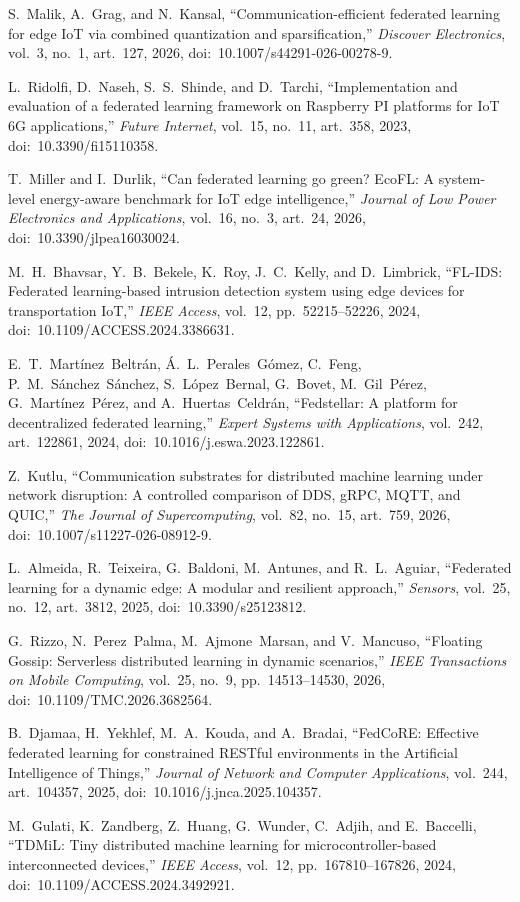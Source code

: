 S.~Malik, A.~Grag, and N.~Kansal,
``Communication-efficient federated learning for edge IoT via combined quantization and sparsification,''
\emph{Discover Electronics}, vol.~3, no.~1, art.~127, 2026, doi:~10.1007/s44291-026-00278-9.

L.~Ridolfi, D.~Naseh, S.~S.~Shinde, and D.~Tarchi,
``Implementation and evaluation of a federated learning framework on Raspberry PI platforms for IoT 6G applications,''
\emph{Future Internet}, vol.~15, no.~11, art.~358, 2023, doi:~10.3390/fi15110358.

T.~Miller and I.~Durlik,
``Can federated learning go green? EcoFL: A system-level energy-aware benchmark for IoT edge intelligence,''
\emph{Journal of Low Power Electronics and Applications}, vol.~16, no.~3, art.~24, 2026, doi:~10.3390/jlpea16030024.

M.~H.~Bhavsar, Y.~B.~Bekele, K.~Roy, J.~C.~Kelly, and D.~Limbrick,
``FL-IDS: Federated learning-based intrusion detection system using edge devices for transportation IoT,''
\emph{IEEE Access}, vol.~12, pp.~52215--52226, 2024, doi:~10.1109/ACCESS.2024.3386631.

E.~T.~Mart\'{i}nez~Beltr\'{a}n, \'{A}.~L.~Perales~G\'{o}mez, C.~Feng, P.~M.~S\'{a}nchez~S\'{a}nchez, S.~L\'{o}pez~Bernal, G.~Bovet, M.~Gil~P\'{e}rez, G.~Mart\'{i}nez~P\'{e}rez, and A.~Huertas~Celdr\'{a}n,
``Fedstellar: A platform for decentralized federated learning,''
\emph{Expert Systems with Applications}, vol.~242, art.~122861, 2024, doi:~10.1016/j.eswa.2023.122861.

Z.~Kutlu,
``Communication substrates for distributed machine learning under network disruption: A controlled comparison of DDS, gRPC, MQTT, and QUIC,''
\emph{The Journal of Supercomputing}, vol.~82, no.~15, art.~759, 2026, doi:~10.1007/s11227-026-08912-9.

L.~Almeida, R.~Teixeira, G.~Baldoni, M.~Antunes, and R.~L.~Aguiar,
``Federated learning for a dynamic edge: A modular and resilient approach,''
\emph{Sensors}, vol.~25, no.~12, art.~3812, 2025, doi:~10.3390/s25123812.

G.~Rizzo, N.~Perez~Palma, M.~Ajmone~Marsan, and V.~Mancuso,
``Floating Gossip: Serverless distributed learning in dynamic scenarios,''
\emph{IEEE Transactions on Mobile Computing}, vol.~25, no.~9, pp.~14513--14530, 2026, doi:~10.1109/TMC.2026.3682564.

B.~Djamaa, H.~Yekhlef, M.~A.~Kouda, and A.~Bradai,
``FedCoRE: Effective federated learning for constrained RESTful environments in the Artificial Intelligence of Things,''
\emph{Journal of Network and Computer Applications}, vol.~244, art.~104357, 2025, doi:~10.1016/j.jnca.2025.104357.

M.~Gulati, K.~Zandberg, Z.~Huang, G.~Wunder, C.~Adjih, and E.~Baccelli,
``TDMiL: Tiny distributed machine learning for microcontroller-based interconnected devices,''
\emph{IEEE Access}, vol.~12, pp.~167810--167826, 2024, doi:~10.1109/ACCESS.2024.3492921.
